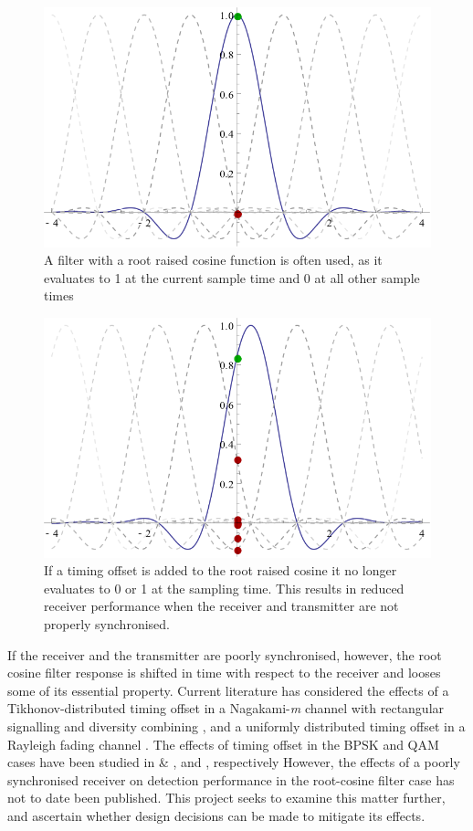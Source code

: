 \begin{figure}[htbp]
\centering
\includegraphics[width=\linewidth]{rrc_sync.png}
\caption{A filter with a root raised cosine function is often used, as
it evaluates to 1 at the current sample time and 0 at all other sample
times}
\end{figure}

\begin{figure}[htbp]
\centering
\includegraphics[width=\linewidth]{rrc_err.png}
\caption{If a timing offset is added to the root raised cosine it no
longer evaluates to 0 or 1 at the sampling time. This results in
reduced receiver performance when the receiver and transmitter are not
properly synchronised.}
\end{figure}

If the receiver and the transmitter are poorly synchronised, however,
the root cosine filter response is shifted in time with respect to the
receiver and looses some of its essential property. Current literature
has considered the effects of a Tikhonov-distributed timing offset in a Nagakami-\emph{m} channel with rectangular signalling and diversity combining \cite{[2]}, and a uniformly distributed timing offset in a Rayleigh fading channel \cite{[6]}. The effects of timing offset in the BPSK and QAM cases have been studied in \cite{[3]} \& \cite{[4]}, and \cite{[5]}, respectively However, the effects of a poorly synchronised receiver on detection performance in the root-cosine filter case has not to date been published. This project seeks to examine this matter further, and ascertain whether design decisions can be made to mitigate its effects.

